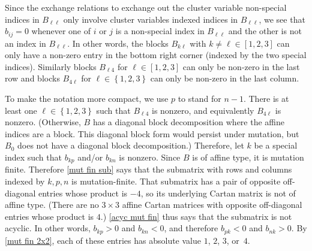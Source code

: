 \documentclass{amsart}
\theoremstyle{definition}
\theoremstyle{remark}
\numberwithin{equation}{section}
\newcommand{\set}[1]{{\left\lbrace #1 \right\rbrace}}
\newcommand{\0}{{\mathbf{0}}}
\begin{document}
Since the exchange relations to exchange out the cluster variable non-special indices in $B_{\ell\ell}$ only involve cluster variables indexed indices in $B_{\ell\ell}$, we see that $b_{ij}=0$ whenever one of $i$ or $j$ is a non-special index in $B_{\ell\ell}$ and the other is not an index in $B_{\ell\ell}$.
In other words, the blocks $B_{k\ell}$ with $k\neq\ell\in[1,2,3]$ can only have a non-zero entry in the bottom right corner (indexed by the two special indices).
Similarly blocks $B_{\ell4}$ for $\ell\in[1,2,3]$ can only be non-zero in the last row and blocks $B_{4\ell}$ for $\ell\in\set{1,2,3}$ can only be non-zero in the last column.

To make the notation more compact, we use $p$ to stand for $n-1$.
There is at least one $\ell\in\set{1,2,3}$ such that $B_{\ell4}$ is nonzero, and equivalently $B_{4\ell}$ is nonzero.
(Otherwise, $B$ has a diagonal block decomposition where the affine indices are a block.
This diagonal block form would persist under mutation, but $B_0$ does not have a diagonal block decomposition.)
Therefore, let $k$ be a special index such that $b_{kp}$ and/or $b_{kn}$ is nonzero.
Since $B$ is of affine type, it is mutation finite.
Therefore \cref{mut fin sub} says that the submatrix with rows and columns indexed by $k,p,n$ is mutation-finite.
That submatrix has a pair of opposite off-diagonal entries whose product is $-4$, so its underlying Cartan matrix is not of affine type.
(There are no $3\times3$ affine Cartan matrices with opposite off-diagonal entries whose product is $4$.)
\cref{acyc mut fin} thus says that the submatrix is not acyclic.
In other words, $b_{kp}>0$ and $b_{kn}<0$, and therefore $b_{pk}<0$ and $b_{nk}>0$.
By \cref{mut fin 2x2}, each of these entries has absolute value $1$, $2$, $3$, or~$4$.
\end{document}

